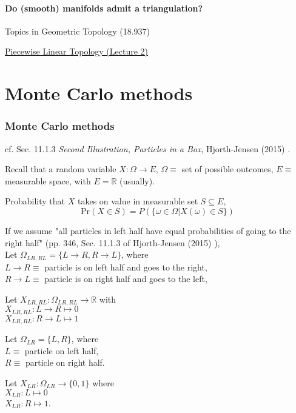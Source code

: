 \documentclass[10pt]{amsart}
\begin{document}
\begin{multicols*}{2}
\subsection{Do (smooth) manifolds admit a triangulation?}

Topics in Geometric Topology (18.937)


\href{http://www.math.harvard.edu/~lurie/937notes/937Lecture2.pdf}{Piecewise Linear Topology (Lecture 2)}

\part{Monte Carlo methods}

\section{Monte Carlo methods}

cf. Sec. 11.1.3 \emph{Second Illustration, Particles in a Box},  Hjorth-Jensen (2015) \cite{Hjor2015}.

Recall that a random variable $X: \Omega \to E$, $\Omega \equiv $ set of possible outcomes, $E \equiv $ measurable space, with $E = \mathbb{R}$ (usually).

Probability that $X$ takes on value in measurable set $S \subseteq E$, 
\[
\text{Pr}(X \in S) = P( \lbrace \omega \in \Omega | X(\omega) \in S \rbrace)
\]

If we assume "all particles in left half have equal probabilities of going to the right half" (pp. 346, Sec. 11.1.3 of Hjorth-Jensen (2015) \cite{Hjor2015}), \\

Let $\Omega_{LR, RL} = \lbrace L \to R, R\to L \rbrace$, where \\
$L \to R \equiv$ particle is on left half and goes to the right, \\
$R \to L \equiv$ particle is on right half and goes to the left, 

Let $X_{LR,RL} : \Omega_{LR, RL} \to \mathbb{R}$ with \\
$X_{LR,RL}: L\to R \mapsto 0$ \\
$X_{LR,RL}: R\to L \mapsto 1$ 

Let $\Omega_{LR} = \lbrace L, R \rbrace$, where \\
$L \equiv $ particle on left half, \\
$R \equiv $ particle on right half.

Let $X_{LR} : \Omega_{LR} \to \lbrace 0 ,1 \rbrace$ where \\
$X_{LR} : L \mapsto 0$ \\
$X_{LR} : R \mapsto 1$.


\end{multicols*}
\end{document}
